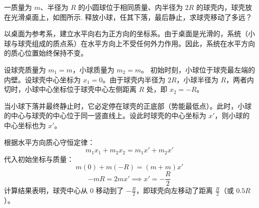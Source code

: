 \begin{exercise}\label{ex:5.2}
一质量为 $m$、半径为 $R$ 的小圆球位于相同质量、内半径为 $2R$ 的球壳内，球壳放在光滑桌面上，如图所示. 释放小球，任其下落，最后静止，求球壳移动了多远？
\begin{center}
\end{center}
\end{exercise}
\begin{solution}
以桌面为参考系，建立水平向右为正方向的坐标系。由于桌面是光滑的，系统（小球与球壳组成的质点系）在水平方向上不受任何外力作用。因此，系统在水平方向的质心位置始终保持不变。

设球壳质量为 $m_1 = m$，小球质量为 $m_2 = m$。
初始时刻，小球位于球壳最左端的内壁。设球壳中心坐标为 $x_1 = 0$。由于球壳内半径为 $2R$，小球半径为 $R$，两者内切时，小球中心坐标位于球壳中心左侧距离 $R$ 处，即 $x_2 = -R$。

当小球下落并最终静止时，它必定停在球壳的正底部（势能最低点）。此时，小球的中心与球壳的中心位于同一竖直线上。设此时球壳的中心坐标为 $x'$，则小球的中心坐标也为 $x'$。

根据水平方向质心守恒定律：
$$ m_1 x_1 + m_2 x_2 = m_1 x' + m_2 x' $$
代入初始坐标与质量：
$$ m(0) + m(-R) = (m + m) x' $$
$$ -mR = 2m x' \implies x' = -\frac{R}{2} $$
计算结果表明，球壳中心从 $0$ 移动到了 $-\frac{R}{2}$，即球壳向左移动了距离 $\frac{R}{2}$（或 $0.5R$）。
\end{solution}

